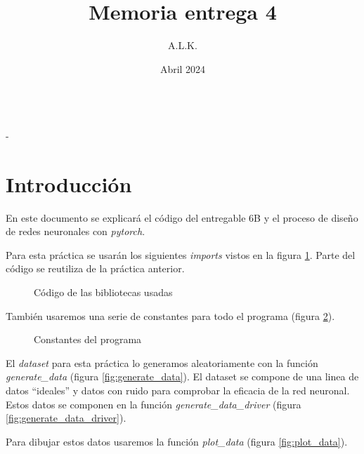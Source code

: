 \documentclass[6pt]{../../shared/AiTex}
\title{Memoria entrega 4}
\author{A.L.K.}
\date{Abril 2024}
\begin{document}
\justify

\begin{center}

    {\huge \textbf{\underline{\subtitulo}}} \\
    { \lesson - \autor}

\end{center}


\section*{Introducción}

En este documento se explicará el código del entregable 6B y el proceso de diseño de redes neuronales con \textit{pytorch}.

Para esta práctica se usarán los siguientes \textit{imports} vistos en la figura \ref{fig:imports}. Parte del código se reutiliza de la práctica anterior.
\begin{figure}[H]
    \centering
    
    \caption{Código de las bibliotecas usadas}
    \label{fig:imports}
\end{figure}

También usaremos una serie de constantes para todo el programa (figura \ref{fig:constants}).

\begin{figure}[H]
    \centering
    
    \caption{Constantes del programa}
    \label{fig:constants}
\end{figure}

El \textit{dataset} para esta práctica lo generamos aleatoriamente con la función \textit{generate\_data} (figura \ref{fig:generate_data}). El dataset se compone de una linea de datos ``ideales'' y datos con ruido para comprobar la eficacia de la red neuronal. Estos datos se componen en la función \textit{generate\_data\_driver} (figura \ref{fig:generate_data_driver}).

Para dibujar estos datos usaremos la función \textit{plot\_data} (figura \ref{fig:plot_data}).
\end{document}
